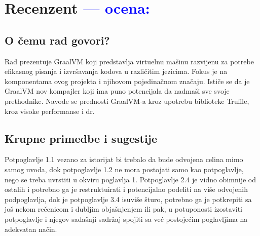 \documentclass[a4paper]{report}
\newcommand{\odgovor}[1]{\textcolor{blue}{#1}}
\begin{document}
\chapter{Recenzent \odgovor{--- ocena:} }
	
	
	\section{O čemu rad govori?}
	Rad prezentuje GraalVM koji predstavlja virtuelnu mašinu razvijenu za potrebe efikasnog pisanja i izvršavanja kodova u različitim jezicima. Fokus je na komponentama ovog projekta i njihovom pojedinačnom značaju. Ističe se da je GraalVM nov kompajler koji ima puno potencijala da nadmaši sve svoje prethodnike. Navode se prednosti GraalVM-a kroz upotrebu biblioteke Truffle, kroz visoke performanse i dr. 
	
	\section{Krupne primedbe i sugestije}
	Potpoglavlje 1.1 vezano za istorijat bi trebalo da bude odvojena celina mimo samog uvoda, dok potpoglavlje 1.2 ne mora postojati samo kao potpoglavlje, nego se treba uvrstiti u okviru poglavlja 1. Potpoglavlje 2.4 je vidno obimnije od ostalih i potrebno ga je restruktuirati i potencijalno podeliti na više odvojenih podpoglavlja, dok je potpoglavlje 3.4 isuviše šturo, potrebno ga je potkrepiti sa još nekom rečenicom i dubljim objašnjenjem ili pak, u potuponosti izostaviti potpoglavlje i njegov sadašnji sadržaj spojiti sa već postojećim poglavljima na adekvatan način.
	
\end{document}
